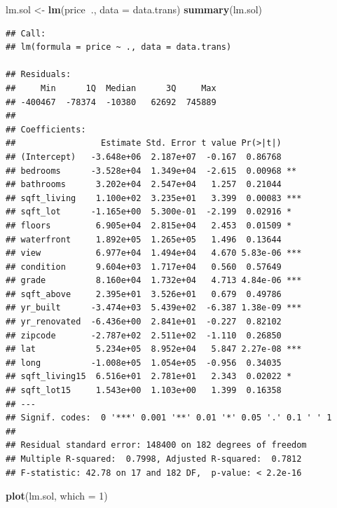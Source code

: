 \documentclass[]{article}
\newenvironment{Shaded}{\begin{snugshade}}{\end{snugshade}}
\newcommand{\KeywordTok}[1]{\textcolor[rgb]{0.13,0.29,0.53}{\textbf{#1}}}
\newcommand{\DataTypeTok}[1]{\textcolor[rgb]{0.13,0.29,0.53}{#1}}
\newcommand{\DecValTok}[1]{\textcolor[rgb]{0.00,0.00,0.81}{#1}}
\newcommand{\StringTok}[1]{\textcolor[rgb]{0.31,0.60,0.02}{#1}}
\newcommand{\OperatorTok}[1]{\textcolor[rgb]{0.81,0.36,0.00}{\textbf{#1}}}
\newcommand{\NormalTok}[1]{#1}
\begin{document}
\begin{Shaded}
\begin{Highlighting}[]
\NormalTok{lm.sol <-}\StringTok{ }\KeywordTok{lm}\NormalTok{(price}\OperatorTok{~}\NormalTok{., }\DataTypeTok{data =}\NormalTok{ data.trans)}
\KeywordTok{summary}\NormalTok{(lm.sol)}
\end{Highlighting}
\end{Shaded}

\begin{verbatim}
## Call:
## lm(formula = price ~ ., data = data.trans)

## Residuals:
##     Min      1Q  Median      3Q     Max 
## -400467  -78374  -10380   62692  745889 
## 
## Coefficients:
##                 Estimate Std. Error t value Pr(>|t|)    
## (Intercept)   -3.648e+06  2.187e+07  -0.167  0.86768    
## bedrooms      -3.528e+04  1.349e+04  -2.615  0.00968 ** 
## bathrooms      3.202e+04  2.547e+04   1.257  0.21044    
## sqft_living    1.100e+02  3.235e+01   3.399  0.00083 ***
## sqft_lot      -1.165e+00  5.300e-01  -2.199  0.02916 *  
## floors         6.905e+04  2.815e+04   2.453  0.01509 *  
## waterfront     1.892e+05  1.265e+05   1.496  0.13644    
## view           6.977e+04  1.494e+04   4.670 5.83e-06 ***
## condition      9.604e+03  1.717e+04   0.560  0.57649    
## grade          8.160e+04  1.732e+04   4.713 4.84e-06 ***
## sqft_above     2.395e+01  3.526e+01   0.679  0.49786    
## yr_built      -3.474e+03  5.439e+02  -6.387 1.38e-09 ***
## yr_renovated  -6.436e+00  2.841e+01  -0.227  0.82102    
## zipcode       -2.787e+02  2.511e+02  -1.110  0.26850    
## lat            5.234e+05  8.952e+04   5.847 2.27e-08 ***
## long          -1.008e+05  1.054e+05  -0.956  0.34035    
## sqft_living15  6.516e+01  2.781e+01   2.343  0.02022 *  
## sqft_lot15     1.543e+00  1.103e+00   1.399  0.16358    
## ---
## Signif. codes:  0 '***' 0.001 '**' 0.01 '*' 0.05 '.' 0.1 ' ' 1
## 
## Residual standard error: 148400 on 182 degrees of freedom
## Multiple R-squared:  0.7998, Adjusted R-squared:  0.7812 
## F-statistic: 42.78 on 17 and 182 DF,  p-value: < 2.2e-16
\end{verbatim}

\begin{Shaded}
\begin{Highlighting}[]
\KeywordTok{plot}\NormalTok{(lm.sol, }\DataTypeTok{which =} \DecValTok{1}\NormalTok{)}
\end{Highlighting}
\end{Shaded}
\end{document}
